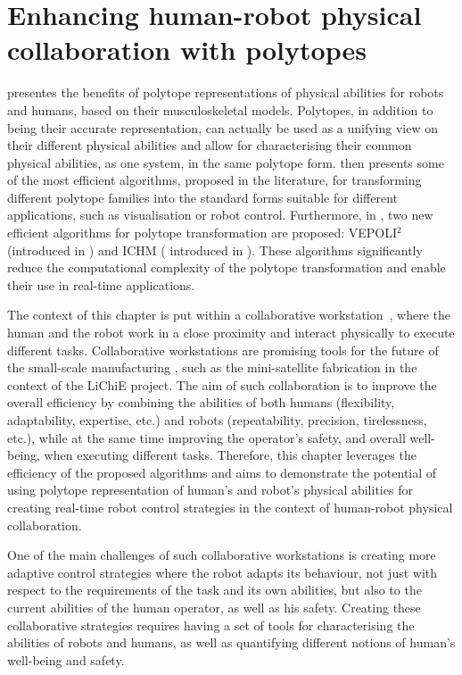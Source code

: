 
\chapter{Enhancing human-robot physical collaboration with polytopes}
\label{ch:physical_interaction}

 presentes the benefits of polytope representations of physical abilities for robots and humans, based on their musculoskeletal models. Polytopes, in addition to being their accurate representation, can actually be used as a unifying view on their different physical abilities and allow for characterising their common physical abilities, as one system, in the same polytope form.  then presents some of the most efficient algorithms, proposed in the literature, for transforming different polytope families into the standard forms suitable for different applications, such as visualisation or robot control. Furthermore, in , two new efficient algorithms for polytope transformation are proposed: VEPOLI$^2$ (introduced in ) and ICHM ( introduced in ). These algorithms significantly reduce the computational complexity of the polytope transformation and enable their use in real-time applications.

The context of this chapter is put within a collaborative workstation~\cite{SIMOES2022workplace,Bejarano2019}, where
the human and the robot work in a close proximity and interact physically to execute different tasks. Collaborative workstations are promising tools for the future of the small-scale manufacturing \cite{Giberti2022Methodology,wang2022futuristic}, such as the mini-satellite fabrication in the context of the LiChiE project.  
The aim of such collaboration is to improve the overall efficiency by combining the abilities of both humans (flexibility, adaptability, expertise, etc.) and robots (repeatability, precision, tirelessness, etc.), while at the same time improving the operator's safety, and overall well-being, when executing different tasks. 
Therefore, this chapter leverages the efficiency of the proposed algorithms and aims to demonstrate the potential of using polytope representation of human's and robot's physical abilities for creating real-time robot control strategies in the context of human-robot physical collaboration.  

One of the main challenges of such collaborative workstations is creating more adaptive control strategies where the robot adapts its behaviour, not just with respect to the requirements of the task and its own abilities, but also to the current abilities of the human operator, as well as his safety. Creating these collaborative strategies requires having a set of tools for characterising the abilities of robots and humans, as well as quantifying different notions of human's well-being and safety. 

